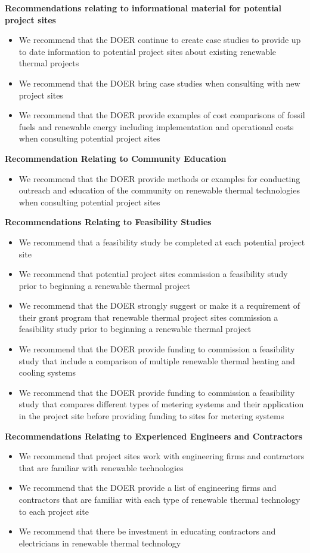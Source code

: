 \noindent
\textbf{Recommendations relating to informational material for potential project sites}
\begin{itemize}
  \item{We recommend that the DOER continue to create case studies to provide up to date information to potential project sites about existing renewable thermal projects}
  \item{We recommend that the DOER bring case studies when consulting with new project sites}
  \item{We recommend that the DOER provide examples of cost comparisons of fossil fuels and renewable energy including implementation and operational costs when consulting potential project sites}
\end{itemize}

\noindent
\textbf{Recommendation Relating to Community Education}
\begin{itemize}
  \item{We recommend that the DOER provide methods or examples for conducting outreach and education of the community on renewable thermal technologies when consulting potential project sites}
\end{itemize}

\noindent
\textbf{Recommendations Relating to Feasibility Studies}
\begin{itemize}
  \item{We recommend that a feasibility study be completed at each potential project site}
  \item{We recommend that potential project sites commission a feasibility study prior to beginning a renewable thermal project}
  \item{We recommend that the DOER strongly suggest or make it a requirement of their grant program that renewable thermal project sites commission a feasibility study prior to beginning a renewable thermal project}
  \item{We recommend that the DOER provide funding to commission a feasibility study that include a comparison of multiple renewable thermal heating and cooling systems}
  \item{We recommend that the DOER provide funding to commission a feasibility study that compares different types of metering systems and their application in the project site before providing funding to sites for metering systems}
\end{itemize}

\noindent
\textbf{Recommendations Relating to Experienced Engineers and Contractors}
\begin{itemize}
  \item{We recommend that project sites work with engineering firms and contractors that are familiar with renewable technologies}
  \item{We recommend that the DOER provide a list of engineering firms and contractors that are familiar with each type of renewable thermal technology to each project site}
  \item{We recommend that there be investment in educating contractors and electricians in renewable thermal technology}
\end{itemize}

